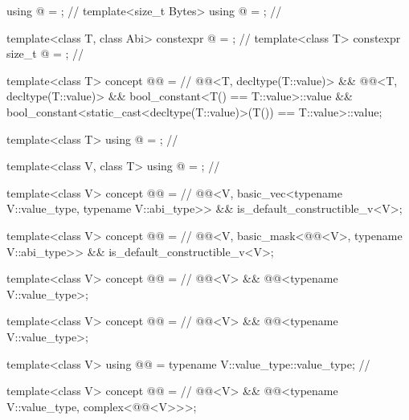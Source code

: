 \begin{codeblock}
using @ = \seebelownc@;                                    // \expos
template<size_t Bytes> using @ = \seebelownc@;               // \expos

template<class T, class Abi>
  constexpr @  = \seebelownc@;                  // \expos
template<class T> constexpr size_t @ = \seebelownc@;    // \expos

template<class T>
  concept @@ =                                   // \expos
    @@<T, decltype(T::value)> &&
    @@<T, decltype(T::value)> &&
    bool_constant<T() == T::value>::value &&
    bool_constant<static_cast<decltype(T::value)>(T()) == T::value>::value;

template<class T> using @ = \seebelownc@;                   // \expos

template<class V, class T> using @ = \seebelownc@; // \expos

template<class V>
  concept @@ =                                            // \expos
    @@<V, basic_vec<typename V::value_type, typename V::abi_type>> &&
    is_default_constructible_v<V>;

template<class V>
  concept @@ =                                           // \expos
    @@<V, basic_mask<@@<V>, typename V::abi_type>> &&
    is_default_constructible_v<V>;

template<class V>
  concept @@ =                                      // \expos
    @@<V> && @@<typename V::value_type>;

template<class V>
  concept @@ =                                            // \expos
    @@<V> && @@<typename V::value_type>;

template<class V>
  using @@ = typename V::value_type::value_type; // \expos

template<class V>
  concept @@ =                                             // \expos
    @@<V> && @@<typename V::value_type, complex<@@<V>>>;


\end{codeblock}
